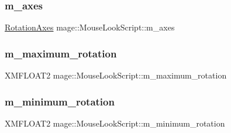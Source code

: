 \subsubsection{\texorpdfstring{m\+\_\+axes}{m\_axes}}
{\footnotesize\ttfamily \hyperlink{namespacemage_a548e5c31b08a1078841ed21948f5bf4c}{Rotation\+Axes} mage\+::\+Mouse\+Look\+Script\+::m\+\_\+axes\hspace{0.3cm}{\ttfamily [private]}}

\hypertarget{classmage_1_1_mouse_look_script_a0d5f2933555b76efd7cf83c7672574dd}{}\label{classmage_1_1_mouse_look_script_a0d5f2933555b76efd7cf83c7672574dd} 
\subsubsection{\texorpdfstring{m\+\_\+maximum\+\_\+rotation}{m\_maximum\_rotation}}
{\footnotesize\ttfamily X\+M\+F\+L\+O\+A\+T2 mage\+::\+Mouse\+Look\+Script\+::m\+\_\+maximum\+\_\+rotation\hspace{0.3cm}{\ttfamily [private]}}

\hypertarget{classmage_1_1_mouse_look_script_ad09bda241666f60dfc408500cafd073d}{}\label{classmage_1_1_mouse_look_script_ad09bda241666f60dfc408500cafd073d} 
\subsubsection{\texorpdfstring{m\+\_\+minimum\+\_\+rotation}{m\_minimum\_rotation}}
{\footnotesize\ttfamily X\+M\+F\+L\+O\+A\+T2 mage\+::\+Mouse\+Look\+Script\+::m\+\_\+minimum\+\_\+rotation\hspace{0.3cm}{\ttfamily [private]}}

\hypertarget{classmage_1_1_mouse_look_script_a4f38b9bd8e7271503a70753ce6a923c7}{}\label{classmage_1_1_mouse_look_script_a4f38b9bd8e7271503a70753ce6a923c7} 
